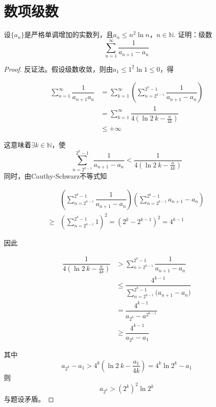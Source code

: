 \section{数项级数}

\begin{proposition}

    设$\{a_n\}$是严格单调增加的实数列，且$a_n \leq n^2 \ln n$，$n\in\mathbb{N}$. 证明：级数
    \[ \sum\limits_{n = 1}^{\infty}{\dfrac{1}{a_{n + 1} - a_n}}\]

\end{proposition}

\begin{proof}

    反证法。假设级数收敛，则由$a_1 \leq 1^2 \ln1 \leq 0$，得
    
    \begin{align*}
        \sum\limits_{n = 1}^{\infty}{\dfrac{1}{a_{n + 1}a_n}} & = \sum\limits_{k = 1}^{\infty}{\left( \sum\limits_{n = 2^{k - 1}}^{2^k - 1}{\dfrac{1}{a_{n + 1} - a_n}} \right)} \\
        & = \sum\limits_{k = 1}^{\infty}{\dfrac{1}{4(\ln{2}\ k - \frac{a}{4k})}} \\
        & \leq +\infty
    \end{align*}

    这意味着$\exists k \in \mathbb{N}$，使
    \[ \sum\limits_{n = 2^{k - 1}}^{2^k - 1}{\dfrac{1}{a_{n + 1} - a_n}} < \dfrac{1}{4(\ln{2}\ k - \frac{a}{4k})}\]
    同时，由\textup{Cauthy-Schwarz}不等式知

    \begin{align*}
        & \left( \sum\limits_{n = 2^{k - 1}}^{2^k - 1}{\dfrac{1}{a_{n + 1} - a_n}} \right) \left( \sum\limits_{n = 2^{k - 1}}^{2^k - 1}{a_{n + 1} - a_n} \right) \\
        \geq & \left( \sum\limits_{n = 2^{k - 1}}^{2^k - 1}{1} \right)^2 = (2^k - 2^{k - 1})^2 =  4^{k - 1}
    \end{align*}

    因此

    \begin{align*}
        \dfrac{1}{4(\ln{2}\ k - \frac{a}{4k})} & > \sum\limits_{n = 2^{k - 1}}^{2^k - 1}{\dfrac{1}{a_{n + 1} - a_n}} \\
        & \leq \dfrac{4^{k - 1}}{\sum\limits_{n = 2^{k - 1}}^{2^k - 1}{(a_{n + 1} - a_n})} \\
        & = \dfrac{4^{k - 1}}{a_{2^k} - a^{2^{k - 1}}} \\
        & \geq \dfrac{4^{k - 1}}{a_{2^k} - a_1}
    \end{align*}

    其中
    \[a_{2^k} - a_1 > 4^k\left( \ln{2}\ k - \dfrac{a_1}{4k} \right) = 4^k \ln{2^k} - a_1\]
    则
    \[a_{2^k} > (2^k)^2 \ln{2^k}\]
    与题设矛盾。

\end{proof}

